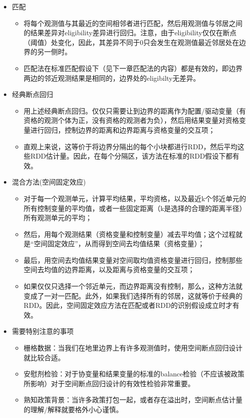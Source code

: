 \documentclass[cn,12pt,math=newtx,citestyle=gb7714-2015,bibstyle=gb7714-2015]{elegantbook}
\begin{document}
	\begin{itemize}
		\item 匹配
		\begin{itemize}
			\item 将每个观测值与其最近的空间相邻者进行匹配，然后用观测值与邻居之间的结果差异对eligibility差异进行回归。注意，由于eligibility仅仅在断点（阈值）处变化，因此，其差异不同于0只会发生在观测值最近邻居处在边界的另一侧时。
			\item 匹配法在标准匹配假设下（见下一章匹配法的内容）都是有效的，即边界两边的邻近观测结果是相同的，边界处的eligibilty无差异。
		\end{itemize}
	   \item 经典断点回归
	   \begin{itemize}
	   	\item 用上述经典断点回归。仅仅只需要让到边界的距离作为配置/驱动变量（有资格的观测个体为正，没有资格的观测者为负），然后用结果变量对资格变量进行回归，控制边界的距离和边界距离与资格变量的交互项；
	   	\item 直观上来说，这等价于将边界分隔出的每个小块都进行RDD，然后平均这些RDD估计量。因此，在每个分隔区，该方法在标准的RDD假设下都有效。
	   \end{itemize}
       \item 混合方法(空间固定效应)
       \begin{itemize}
       	\item 对于每一个观测单元，计算平均结果，平均资格，以及最近k个邻近单元的所有控制变量的平均值，或者一些固定距离（k是选择的合理的距离半径）所有观测单元的平均；
       	\item 然后，用每个观测结果（资格变量和控制变量）减去平均值；这个过程就是“空间固定效应”，从而得到空间去均值结果（资格变量）；
       	\item 最后，用空间去均值结果变量对空间取均值资格变量进行回归，控制那些空间去均值的边界距离，以及距离与资格变量的交互项；
       	\item 如果仅仅只选择一个邻近单元，而边界距离没有控制，那么，这种方法就变成了一对一匹配。此外，如果我们选择所有的邻居，这就等价于经典的RDD。因此，空间固定效应方法在匹配或者RDD的识别假设成立时才有效。
       \end{itemize}
       \item 需要特别注意的事项
       \begin{itemize}
       	\item 栅格数据：当我们在地里边界上有许多观测值时，使用空间断点回归设计就比较合适。
       	\item 安慰剂检验：对于协变量和结果变量的标准的balance检验（不应该被政策所影响）对于空间断点回归设计的有效性检验非常重要。
       	\item 熟知政策背景：当许多政策打包一起，或者存在溢出时，空间断点估计量的理解/解释就要格外小心谨慎。
       \end{itemize}
	\end{itemize}
\end{document}
